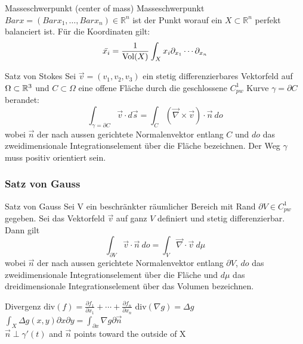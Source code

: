 \begin{Satz}{Masseschwerpunkt (center of mass)}{}
	Masseschwerpunkt $Bar{x} = (Bar{x_1}, \dots, Bar{x_n}) \in \mathbb{R}^n$ ist der Punkt worauf ein $X \subset \mathbb{R}^n$ perfekt balanciert ist. Für die Koordinaten gilt:
	\[
	\Bar{x_i} = \frac{1}{\text{Vol}(X)}\int_X x_i \partial_{x_1} \cdots \partial_{x_n}
	\]
\end{Satz}

\begin{Satz}{Satz von Stokes}{}
	Sei $\vec{v} = (v_1, v_2, v_3)$ ein stetig differenzierbares Vektorfeld auf $\Omega \subset \mathbb{R}^3$ und $C \subset \Omega$ eine offene Fläche durch die geschlossene $C^1_{pw}$ Kurve $\gamma = \partial C$ berandet:
	\[
		\int_{\gamma=\partial C} \vec{v} \cdot d\vec{s} = 
		\int_C (\vec \nabla \times \vec v) \cdot \vec n\ do
	\]
	wobei $\vec n$ der nach aussen gerichtete Normalenvektor entlang $C$ und $do$ das zweidimensionale Integrationselement über die Fläche bezeichnen. Der Weg $\gamma$ muss positiv orientiert sein.	
	
\end{Satz}

\subsubsection{Satz von Gauss}

\begin{Satz}{Satz von Gauss}{}
	Sei V ein beschränkter räumlicher Bereich mit Rand $\partial V \in C^1_{pw}$ gegeben. Sei das Vektorfeld $\vec v$ auf ganz $V$ definiert und stetig differenzierbar. Dann gilt
	\[
		\int_{\partial V} \vec v \cdot \vec n\ do = \int_V \vec \nabla \cdot \vec v\ d \mu
	\]
	wobei $\vec n$ der nach aussen gerichtete Normalenvektor entlang $\partial V$, $do$ das zweidimensionale Integrationselement über die Fläche und $d\mu$ das dreidimensionale Integrationselement über das Volumen bezeichnen.
\end{Satz}

\begin{Definition}{Divergenz}{}
$\text{div}(f) = \frac{\partial f_1}{\partial x_1} + \cdots + \frac{\partial f_n}{\partial x_n}$ \quad div$(\nabla g) = \Delta g$ \quad $\int_X \Delta g (x,y) \partial x \partial y = \int_{\partial x} \nabla g \partial \Vec{n}$\\
$\Vec{n} \perp \gamma'(t)$ and $\Vec{n}$ points toward the outside of X
\end{Definition}
